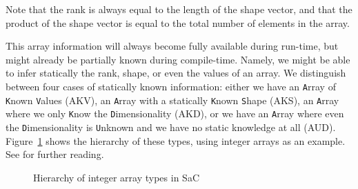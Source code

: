 \noindent
Note that the rank is always equal to the length of the shape vector, and that the product of the shape vector is equal to the total number of elements in the array.

This array information will always become fully available during run-time, but might already be partially known during compile-time.
Namely, we might be able to infer statically the rank, shape, or even the values of an array.
We distinguish between four cases of statically known information:
either we have an \texttt{A}rray of \texttt{K}nown \texttt{V}alues (AKV),
an \texttt{A}rray with a statically \texttt{K}nown \texttt{S}hape (AKS),
an \texttt{A}rray where we only \texttt{K}now the \texttt{D}imensionality (AKD),
or we have an \texttt{A}rray where even the \texttt{D}imensionality is \texttt{U}nknown and we have no static knowledge at all (AUD).
Figure~\ref{fig:hierarchy} shows the hierarchy of these types, using integer arrays as an example.
See \cite{sac-array} for further reading.

\begin{figure}[hbt]
\small
{}
\caption{Hierarchy of integer array types in SaC}
\label{fig:hierarchy}
\end{figure}

